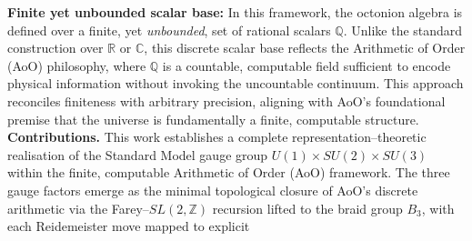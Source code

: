 \documentclass[12pt]{article}
\theoremstyle{remark}
\begin{document}
\smallskip
\noindent
\textbf{Finite yet unbounded scalar base:} 
In this framework, the octonion algebra is defined over a finite, yet \emph{unbounded}, set of rational scalars \(\mathbb{Q}\). 
Unlike the standard construction over \(\mathbb{R}\) or \(\mathbb{C}\), this discrete scalar base reflects the Arithmetic of Order (AoO) philosophy, where \(\mathbb{Q}\) is a countable, computable field sufficient to encode physical information without invoking the uncountable continuum. 
This approach reconciles finiteness with arbitrary precision, aligning with AoO’s foundational premise that the universe is fundamentally a finite, computable structure. \\
\smallskip
\noindent
\textbf{Contributions.}
This work establishes a complete representation--theoretic realisation of the Standard Model gauge group
\(
U(1) \times SU(2) \times SU(3)
\)
within the finite, computable Arithmetic of Order (AoO) framework.
The three gauge factors emerge as the minimal topological closure of AoO's discrete arithmetic via the
Farey--\(SL(2,\mathbb{Z})\) recursion lifted to the braid group \(B_3\), with each Reidemeister move mapped to explicit
\end{document}
